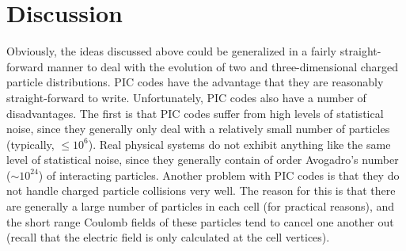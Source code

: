\section{Discussion}
Obviously, the ideas discussed above could be generalized in a fairly
straight-forward manner to deal with the evolution of two and three-dimensional charged particle distributions. PIC codes have the advantage that
they are reasonably straight-forward to write. Unfortunately, PIC codes
also have a number of disadvantages. The first is that PIC codes suffer from
high levels of statistical noise,  since they generally only deal with a
relatively small number of particles (typically, $\leq 10^6$). Real 
physical systems
do not exhibit anything like the same level of statistical noise, since they generally
contain of order Avogadro's number ($\sim 10^{24}$) of interacting particles.  Another problem
with PIC codes is that they do not handle charged particle collisions very
well. The reason for this is that there are generally a large number
of particles in each cell (for practical reasons),  and the short range Coulomb fields of these
particles tend to cancel one another out (recall that the electric field is only
calculated at the cell vertices).
